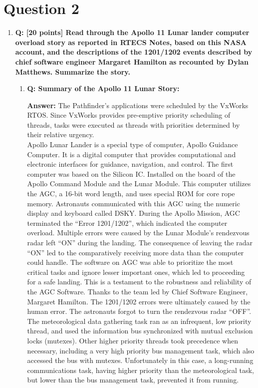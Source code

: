 \documentclass[a4paper,11pt]{article}%
\newenvironment{qanda}{\setlength{\parindent}{0pt}}{\bigskip}
\newcommand{\Q}{\bigskip\bfseries Q: }
\newcommand{\A}{\par\textbf{Answer: } \normalfont}
\begin{document}
\begin{qanda}
	\section{Question 2}
	\begin{enumerate}
		\item[] \Q [20 points] Read through the Apollo 11 Lunar lander computer overload story as reported in RTECS Notes, based on this NASA account, and the descriptions of the 1201/1202 events described by chief software engineer Margaret Hamilton as recounted by Dylan Matthews. Summarize the story.
			\begin{enumerate}
				\item \Q Summary of the Apollo 11 Lunar Story:

				      \A 
					  The Pathfinder's applications were scheduled by the VxWorks RTOS. Since VxWorks provides pre-emptive priority scheduling of threads, tasks were executed as threads with priorities determined by their relative urgency.\\

				      Apollo Lunar Lander is a special type of computer, Apollo Guidance Computer. It is a digital computer that provides computational and electronic interfaces for guidance, navigation, and control. The first computer was based on the Silicon IC. Installed on the board of the Apollo Command Module and the Lunar Module. This computer utilizes the AGC, a 16-bit word length, and uses special ROM for core rope memory. Astronauts communicated with this AGC using the numeric display and keyboard called DSKY. During the Apollo Mission, AGC terminated the “Error 1201/1202”, which indicated the computer overload. Multiple errors were caused by the Lunar Module’s rendezvous radar left “ON” during the landing. The consequence of leaving the radar “ON” led to the comparatively receiving more data than the computer could handle. The software on AGC was able to prioritize the most critical tasks and ignore lesser important ones, which led to proceeding for a safe landing. This is a testament to the robustness and reliability of the AGC Software. Thanks to the team led by Chief Software Engineer, Margaret Hamilton. The 1201/1202 errors were ultimately caused by the human error. The astronauts forgot to turn the rendezvous radar “OFF”.\\


					  The meteorological data gathering task ran as an infrequent, low priority thread, and used the information bus synchronized with mutual exclusion locks (mutexes). Other higher priority threads took precedence when necessary, including a very high priority bus management task, which also accessed the bus with mutexes. Unfortunately in this case, a long-running communications task, having higher priority than the meteorological task, but lower than the bus management task, prevented it from running.\\
					  

\end{enumerate}
\end{enumerate}
\end{qanda}
\end{document}

